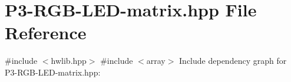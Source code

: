 \hypertarget{P3-RGB-LED-matrix_8hpp}{}\section{P3-\/\+R\+G\+B-\/\+L\+E\+D-\/matrix.hpp File Reference}
\label{P3-RGB-LED-matrix_8hpp}
{\ttfamily \#include $<$hwlib.\+hpp$>$}\newline
{\ttfamily \#include $<$array$>$}\newline
Include dependency graph for P3-\/\+R\+G\+B-\/\+L\+E\+D-\/matrix.hpp\+:

